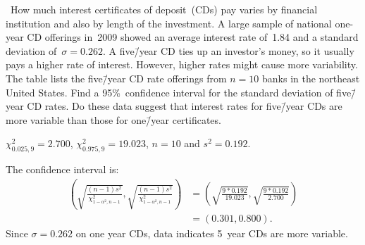 \begin{problem}
  ~How much interest certificates of deposit~(CDs) pay varies by financial institution and also by length of the investment.  A large sample of national one-year CD offerings in~2009 showed an average interest rate of~1.84 and a standard deviation of~${\sigma  = 0.262}$.  A five\=/year CD ties up an investor's money, so it usually pays a higher rate of interest.  However, higher rates might cause more variability.  The table lists the five\=/year CD rate offerings from ${n = 10}$ banks in the northeast United States.  Find a 95\%~confidence interval for the standard deviation of five\=/year CD rates.  Do these data suggest that interest rates for five\=/year CDs are more variable than those for one\=/year certificates.
\end{problem}

${\chi_{0.025,9}^2 = 2.700}$, ${\chi_{0.975,9}^2 = 19.023}$, ${n =10}$ and ${s^2 = 0.192}$.

The confidence interval is:
\begin{align}
  \left(\sqrt{\frac{(n-1)s^2}{\chi^{2}_{1-\alpha^2,n-1}}},\sqrt{\frac{(n-1)s^2}{\chi^{2}_{1-\alpha^2,n-1}}}\right) &= \left(\sqrt{\frac{9 * 0.192}{19.023}}, \sqrt{\frac{9 * 0.192}{2.700}}\right) \\
                                                                                                          &= \left(0.301,0.800\right)\text{.}
\end{align}
Since ${\sigma = 0.262}$ on one year CDs, data indicates 5~year CDs are more variable.
